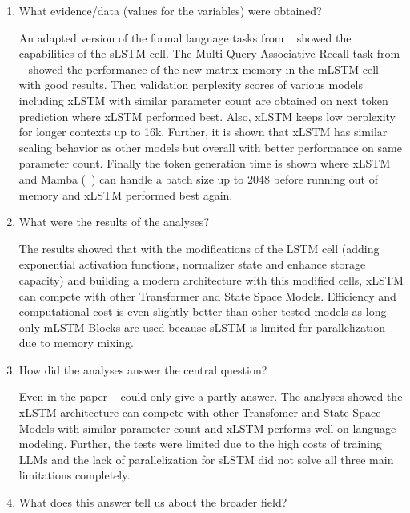 \documentclass[a4paper,oneside,10pt,ngerman,english]{scrartcl}
\begin{document}
\begin{enumerate}
\item What evidence/data (values for the variables) were obtained?

An adapted version of the formal language tasks from \citeauthor{delétang2023neuralnetworkschomskyhierarchy}~\cite{delétang2023neuralnetworkschomskyhierarchy} showed the capabilities of the sLSTM cell. The Multi-Query Associative
Recall task from \citeauthor{arora2023zoologymeasuringimprovingrecall}~\cite{arora2023zoologymeasuringimprovingrecall} showed the performance of the new matrix memory in the mLSTM cell with good results. Then validation perplexity scores of various models including xLSTM with similar parameter count are obtained on next token prediction where xLSTM performed best. Also, xLSTM keeps low perplexity for longer contexts up to 16k. Further, it is shown that xLSTM has similar scaling behavior as other models but overall with better performance on same parameter count. Finally the token generation time is shown where xLSTM and Mamba (\citeauthor{gu2024mambalineartimesequencemodeling}~\cite{gu2024mambalineartimesequencemodeling}) can handle a batch size up to 2048 before running out of memory and xLSTM performed best again.

\item What were the results of the analyses?

The results showed that with the modifications of the LSTM cell (adding exponential activation functions, normalizer state and enhance storage capacity) and building a modern architecture with this modified cells, xLSTM can compete with other Transformer and State Space Models. Efficiency and computational cost is even slightly better than other tested models as long only mLSTM Blocks are used because sLSTM is limited for parallelization due to memory mixing.

\item How did the analyses answer the central question?

Even in the paper \citeauthor{beck2024xlstmextendedlongshortterm}~\cite{beck2024xlstmextendedlongshortterm} could only give a partly answer. The analyses showed the xLSTM architecture can compete with other Transfomer and State Space Models with similar parameter count and xLSTM performs well on language modeling. Further, the tests were limited due to the high costs of training LLMs and the lack of parallelization for sLSTM did not solve all three main limitations completely. 

\item What does this answer tell us about the broader field?


\end{enumerate}
\end{document}
